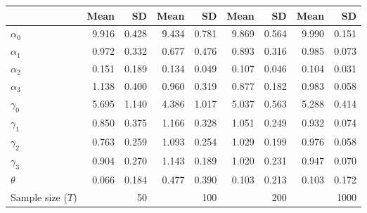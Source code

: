 
\begin{tabular}[t]{lrrrrrrrr}
\toprule
  & Mean & SD & Mean  & SD  & Mean   & SD   & Mean    & SD   \\
\midrule
$\alpha_{0}$ & 9.916 & 0.428 & 9.434 & 0.781 & 9.869 & 0.564 & 9.990 & 0.151\\
$\alpha_{1}$ & 0.972 & 0.332 & 0.677 & 0.476 & 0.893 & 0.316 & 0.985 & 0.073\\
$\alpha_{2}$ & 0.151 & 0.189 & 0.134 & 0.049 & 0.107 & 0.046 & 0.104 & 0.031\\
$\alpha_{3}$ & 1.138 & 0.400 & 0.960 & 0.319 & 0.877 & 0.182 & 0.983 & 0.058\\
$\gamma_{0}$ & 5.695 & 1.140 & 4.386 & 1.017 & 5.037 & 0.563 & 5.288 & 0.414\\
$\gamma_{1}$ & 0.850 & 0.375 & 1.166 & 0.328 & 1.051 & 0.249 & 0.932 & 0.074\\
$\gamma_{2}$ & 0.763 & 0.259 & 1.093 & 0.254 & 1.029 & 0.199 & 0.976 & 0.058\\
$\gamma_{3}$ & 0.904 & 0.270 & 1.143 & 0.189 & 1.020 & 0.231 & 0.947 & 0.070\\
$\theta$ & 0.066 & 0.184 & 0.477 & 0.390 & 0.103 & 0.213 & 0.103 & 0.172\\
Sample size ($T$) &  & 50 &  & 100 &  & 200 &  & 1000\\
\bottomrule
\end{tabular}
